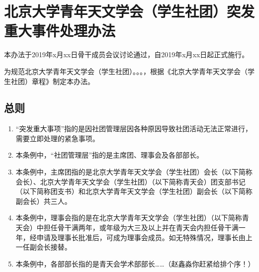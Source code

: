 \chapter{北京大学青年天文学会（学生社团）突发重大事件处理办法}

本办法于2019年x月xx日骨干成员会议讨论通过，自2019年x月xx日起正式施行。

为规范北京大学青年天文学会（学生社团）。。。，根据《北京大学青年天文学会（学生社团）章程》制定本办法。

\section{总则}

\begin{enumerate}
    \item “突发重大事项”指的是因社团管理层因各种原因导致社团活动无法正常进行，需要立即处理的紧急事项。
    
    \item 本条例中，“社团管理层”指的是主席团、理事会及各部部长。
    
    \item 本条例中，主席团指的是北京大学青年天文学会（学生社团）会长（以下简称会长）、北京大学青年天文学会（学生社团）（以下简称青天会）团支部书记（以下简称团支书）和北京大学青年天文学会（学生社团）副会长（以下简称副会长）共三人。
    
    \item 本条例中，理事会指的是在北京大学青年天文学会（学生社团）（以下简称青天会）中担任骨干满两年，或年级为大三及以上并在青天会内担任骨干满一年，经申请及理事长批准后，可成为理事会成员。如无特殊情况，理事长由上一任副会长接替。
    
    \item 本条例中，各部部长指的是青天会学术部部长……（赵鑫淼你赶紧给排个序！）
    

\end{enumerate}
